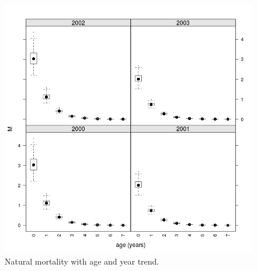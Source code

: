 \documentclass[a4paper,english,10pt]{article}\usepackage[]{graphicx}\usepackage[]{color}
\newenvironment{knitrout}{}{} %
\begin{document}
\begin{knitrout}
\color{fgcolor}\begin{figure}[H]

{\centering \includegraphics[width=.9\linewidth]{figure/uncertain_m-1} 

}

\caption[Natural mortality with age and year trend]{Natural mortality with age and year trend.}\label{fig:uncertain_m}
\end{figure}


\end{knitrout}
\end{document}
